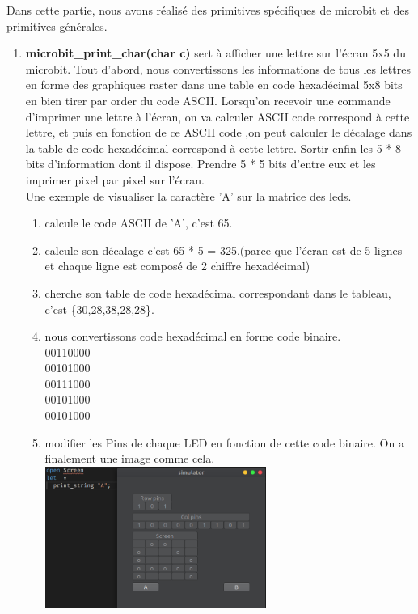 \documentclass[14px]{article}
\begin{document}
Dans cette partie, nous avons réalisé des primitives spécifiques de microbit et des primitives générales.
\begin{enumerate}
	\item \textbf{microbit\_print\_char(char c)} sert à afficher une lettre sur l'écran 5x5 du microbit.
	Tout d'abord, nous convertissons les informations de tous les lettres en forme des graphiques raster dans une table en code hexadécimal 5x8 bits en bien tirer par order du code ASCII. Lorsqu'on recevoir une commande d'imprimer une lettre à l'écran,
	on va calculer ASCII code correspond à cette lettre, et puis en fonction de ce ASCII code ,on peut calculer le décalage dans la table de code hexadécimal correspond à cette lettre. Sortir enfin les 5 * 8 bits d'information dont il dispose. Prendre 5 * 5 bits d'entre eux et les imprimer pixel par pixel sur l'écran.\\

	Une exemple de visualiser la caractère 'A' sur la matrice des leds.
	\begin{enumerate}
		\item calcule le code ASCII de 'A', c'est 65.
		\item calcule son décalage c'est 65 * 5 = 325.(parce que l'écran est de 5 lignes et chaque ligne est composé de 2 chiffre hexadécimal)
		\item cherche son table de code hexadécimal correspondant dans le tableau, c'est \{30,28,38,28,28\}.
		\item nous convertissons code hexadécimal en forme code binaire.\\
		00110000\\
		00101000\\
		00111000\\
		00101000\\
		00101000
		\item modifier les Pins de chaque LED en fonction de cette code binaire. On a finalement une image comme cela.\\
		\includegraphics[width=0.6\textwidth]{printA.png}\\[1cm]
	\end{enumerate}


\end{enumerate}
\end{document}
